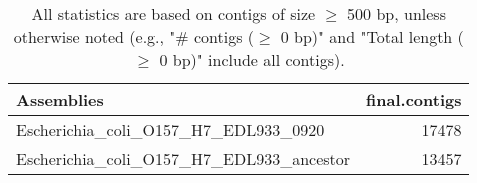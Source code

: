 \documentclass[12pt,a4paper]{article}
\begin{document}
\begin{table}[ht]
\begin{center}
\caption{All statistics are based on contigs of size $\geq$ 500 bp, unless otherwise noted (e.g., "\# contigs ($\geq$ 0 bp)" and "Total length ($\geq$ 0 bp)" include all contigs).}
\begin{tabular}{|l*{1}{|r}|}
\hline
Assemblies & final.contigs \\ \hline
Escherichia\_coli\_O157\_H7\_EDL933\_0920 & 17478 \\ \hline
Escherichia\_coli\_O157\_H7\_EDL933\_ancestor & 13457 \\ \hline
\end{tabular}
\end{center}
\end{table}
\end{document}

